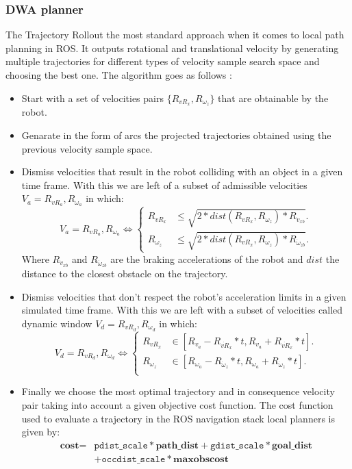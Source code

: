 \subsubsection{DWA planner}
The Trajectory Rollout  the most standard approach when it comes to local path planning in \ac{ROS}. It outputs  rotational and translational velocity by generating multiple trajectories for different types of velocity sample search space and choosing the best one. The algorithm goes as follows \cite{inbookdwa}:
\begin{itemize}
    \item Start with a set of velocities pairs $\{R_{vR_x},R_{ \omega_z} \}$ that are obtainable by the robot.
    \item Genarate in the form of arcs the projected trajectories obtained using the previous velocity sample space.
    \item Dismiss velocities that result in the robot colliding with an object in a given time frame. With this we are left of a subset of admissible velocities $V_a=R_{vR_a},R_{ \omega_a}$ in which:
    \begin{equation}
         V_a=R_{vR_a},R_{ \omega_a} \iff \begin{cases}
    R_{vR_x} & 	\leq \sqrt{2*dist(R_{vR_x},R_{ \omega_z})*R_{\dot{v}_{xb}}}.\\
    R_{ \omega_z}  &  	\leq \sqrt{2*dist(R_{vR_x},R_{ \omega_z})*R_{\dot{\omega}_{zb}}}.
  \end{cases}
    \end{equation}
    Where $R_{\dot{v}_{xb}}$ and $R_{\dot{\omega}_{zb}}$ are the braking accelerations of the robot and $dist$ the distance to the closest obstacle on the trajectory.
    
    
    \item Dismiss velocities that don't respect the robot's acceleration limits in a given simulated time frame. With this we are left with a subset of velocities called dynamic window $V_d=R_{vR_d},R_{ \omega_d}$  in which:
    \begin{equation}
         V_d=R_{vR_d},R_{ \omega_d} \iff \begin{cases}
    R_{vR_x} & 	\in [R_{v_a}-R_{\dot{vR}_{x}}*t,R_{v_a} + R_{\dot{vR}_{x}}*t].\\
    R_{\omega_z} & 	\in [R_{ \omega_a}-R_{\dot{\omega}_{z}}*t,R_{\omega_a}+R_{\dot{\omega}_{z}}*t].\\
  \end{cases}
    \end{equation}
    \item Finally we choose  the most optimal trajectory and in consequence velocity pair taking into account a given objective cost function.
    The cost function used to evaluate a trajectory in the \ac{ROS} navigation stack local planners is given by:
    \begin{align*}
            \textbf{cost} = &
       \texttt{pdist\_scale} * \textbf{path\_dist}
       + \texttt{gdist\_scale} * \textbf{goal\_dist}\\
       &+\texttt{occdist\_scale} * \textbf{maxobscost} 
    \end{align*}
    

\end{itemize}
